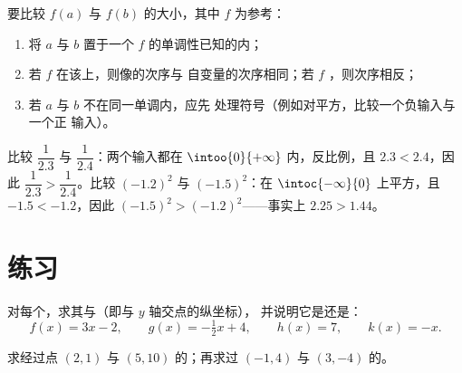 \begin{method}[比较像的大小]\label{met:g10:reffunc:compare}
要比较 $f(a)$ 与 $f(b)$ 的大小，其中 $f$ 为参考：
\begin{enumerate}
  \item 将 $a$ 与 $b$ 置于一个
        $f$ 的单调性已知的内；
  \item 若 $f$ 在该上，则像的次序与
        自变量的次序相同；若 $f$ ，则次序相反；
  \item 若 $a$ 与 $b$ 不在同一单调内，应先
        处理符号（例如对平方，比较一个负输入与一个正
        输入）。
\end{enumerate}
\end{method}

\begin{example}
比较 $\dfrac{1}{2.3}$ 与 $\dfrac{1}{2.4}$：两个输入都在
$\intoo{0}{+\infty}$ 内，反比例，且
$2.3 < 2.4$，因此 $\dfrac{1}{2.3} > \dfrac{1}{2.4}$。比较 $(-1.2)^2$
与 $(-1.5)^2$：在 $\intoc{-\infty}{0}$ 上平方，且
$-1.5 < -1.2$，因此 $(-1.5)^2 > (-1.2)^2$——事实上 $2.25 > 1.44$。
\end{example}

\section{练习}

\begin{exercise}[$\star$]\label{exo:g10:reffunc:1}
对每个，求其与（即与 $y$ 轴交点的纵坐标），
并说明它是还是：
\[
f(x) = 3x - 2, \qquad
g(x) = -\tfrac12 x + 4, \qquad
h(x) = 7, \qquad
k(x) = -x .
\]
\end{exercise}

\begin{exercise}[$\star$]\label{exo:g10:reffunc:2}
求经过点 $(2, 1)$ 与
$(5, 10)$ 的；再求过 $(-1, 4)$ 与 $(3, -4)$ 的。
\end{exercise}

